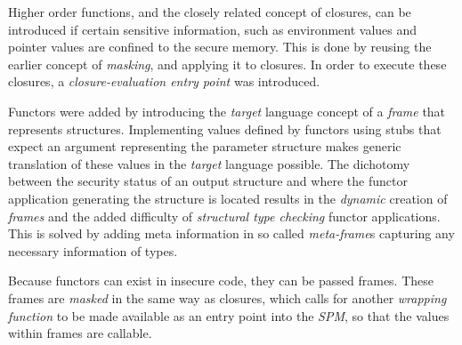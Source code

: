 Higher order functions, and the closely related concept of closures, can be introduced if certain sensitive information, such as environment values and pointer values are confined to the secure memory.
This is done by reusing the earlier concept of \emph{masking}\cite{Patrignani}, and applying it to closures.
In order to execute these closures, a \emph{closure-evaluation entry point} was introduced.

Functors were added by introducing the \emph{target} language concept of a \emph{frame} that represents structures.
Implementing values defined by functors using stubs that expect an argument representing the parameter structure makes generic translation of these values in the \emph{target} language possible.
The dichotomy between the security status of an output structure and where the functor application generating the structure is located results in the \emph{dynamic} creation of \emph{frames} and the added difficulty of \emph{structural type checking} functor applications.
This is solved by adding meta information in so called \emph{meta-frame}s capturing any necessary information of types.

Because functors can exist in insecure code, they can be passed frames. These frames are \emph{masked} in the same way as closures, which calls for another \emph{wrapping function} to be made available as an entry point into the \emph{SPM}, so that the values within frames are callable.